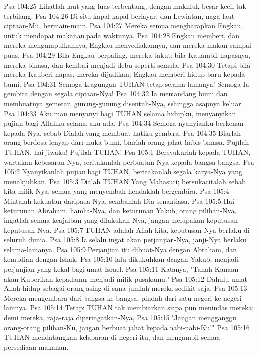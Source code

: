 Psa 104:25  Lihatlah laut yang luas terbentang, dengan makhluk besar kecil tak terbilang.
Psa 104:26  Di situ kapal-kapal berlayar, dan Lewiatan, naga laut ciptaan-Mu, bermain-main.
Psa 104:27  Mereka semua mengharapkan Engkau, untuk mendapat makanan pada waktunya.
Psa 104:28  Engkau memberi, dan mereka mengumpulkannya, Engkau menyediakannya, dan mereka makan sampai puas.
Psa 104:29  Bila Engkau berpaling, mereka takut; bila Kauambil napasnya, mereka binasa, dan kembali menjadi debu seperti semula.
Psa 104:30  Tetapi bila mereka Kauberi napas, mereka dijadikan; Engkau memberi hidup baru kepada bumi.
Psa 104:31  Semoga keagungan TUHAN tetap selama-lamanya! Semoga Ia gembira dengan segala ciptaan-Nya!
Psa 104:32  Ia memandang bumi dan membuatnya gemetar, gunung-gunung disentuh-Nya, sehingga asapnya keluar.
Psa 104:33  Aku mau menyanyi bagi TUHAN selama hidupku, menyanyikan pujian bagi Allahku selama aku ada.
Psa 104:34  Semoga nyanyianku berkenan kepada-Nya, sebab Dialah yang membuat hatiku gembira.
Psa 104:35  Biarlah orang berdosa lenyap dari muka bumi, biarlah orang jahat habis binasa. Pujilah TUHAN, hai jiwaku! Pujilah TUHAN!
Psa 105:1  Bersyukurlah kepada TUHAN, wartakan kebesaran-Nya, ceritakanlah perbuatan-Nya kepada bangsa-bangsa.
Psa 105:2  Nyanyikanlah pujian bagi TUHAN, beritakanlah segala karya-Nya yang menakjubkan.
Psa 105:3  Dialah TUHAN Yang Mahasuci; bersukacitalah sebab kita milik-Nya, semua yang menyembah hendaklah bergembira.
Psa 105:4  Mintalah kekuatan daripada-Nya, sembahlah Dia senantiasa.
Psa 105:5  Hai keturunan Abraham, hamba-Nya, dan keturunan Yakub, orang pilihan-Nya, ingatlah semua keajaiban yang dilakukan-Nya, jangan melupakan keputusan-keputusan-Nya.
Psa 105:7  TUHAN adalah Allah kita, keputusan-Nya berlaku di seluruh dunia.
Psa 105:8  Ia selalu ingat akan perjanjian-Nya, janji-Nya berlaku selama-lamanya.
Psa 105:9  Perjanjian itu dibuat-Nya dengan Abraham, dan kemudian dengan Ishak;
Psa 105:10  lalu dikukuhkan dengan Yakub, menjadi perjanjian yang kekal bagi umat Israel.
Psa 105:11  Katanya, "Tanah Kanaan akan Kuberikan kepadamu, menjadi milik pusakamu."
Psa 105:12  Dahulu umat Allah hidup sebagai orang asing di sana jumlah mereka sedikit saja.
Psa 105:13  Mereka mengembara dari bangsa ke bangsa, pindah dari satu negeri ke negeri lainnya.
Psa 105:14  Tetapi TUHAN tak membiarkan siapa pun menindas mereka; demi mereka, raja-raja diperingatkan-Nya,
Psa 105:15  "Jangan mengganggu orang-orang pilihan-Ku, jangan berbuat jahat kepada nabi-nabi-Ku!"
Psa 105:16  TUHAN mendatangkan kelaparan di negeri itu, dan mengambil semua persediaan makanan.
